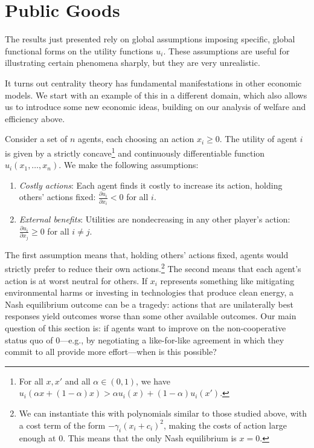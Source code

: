\documentclass{notices}
\theoremstyle{definition}\newtheorem{problem}{Problem}
\begin{document}
\section*{Public Goods}


The results just presented rely on global assumptions imposing specific, global functional forms on the utility functions $u_i$. These assumptions are useful for illustrating certain phenomena sharply, but they are very unrealistic. 


It turns out centrality theory has fundamental manifestations in other economic models. We start with an example of this in a different domain, which also allows us to introduce some new economic ideas, building on our analysis of welfare and efficiency above.


Consider a set of $n$ agents, each choosing an action $x_i \geq 0$. The utility of agent $i$ is given by a strictly concave\footnote{For all $x,x'$ and all $\alpha \in (0,1)$, we have $u_i(\alpha x +(1-\alpha)x)>\alpha u_i(x) + (1-\alpha)u_i(x')$.} and continuously differentiable function $u_i(x_1, \ldots, x_n)$. We make the following assumptions:
\begin{enumerate}
    \item \emph{Costly actions}: Each agent finds it costly to increase its action, holding others' actions fixed: $\frac{\partial u_i}{\partial x_i} < 0$ for all $i$.
    \item \emph{External benefits}: Utilities are nondecreasing in any other player's action: $\frac{\partial u_i}{\partial x_j} \geq 0$ for all $i \neq j$.
\end{enumerate} 
The first assumption means that, holding others' actions fixed, agents would strictly prefer to reduce their own actions.\footnote{We can instantiate this with polynomials similar to those studied above, with a cost term of the form $-\gamma_i(x_i+c_i)^2$, making the costs of action large enough at $0$. This means that the only Nash equilibrium is $x=0$.} The second means that each agent's action is at worst neutral for others.  If $x_i$ represents something like mitigating environmental harms or investing in technologies that produce clean energy, a Nash equilibrium outcome can be a tragedy: actions that are unilaterally best responses yield outcomes worse than some other available outcomes. Our main question of this section is: if agents want to improve on the non-cooperative status quo of $0$---e.g., by negotiating a like-for-like agreement in which they commit to all provide more effort---when is this possible?
\end{document}
